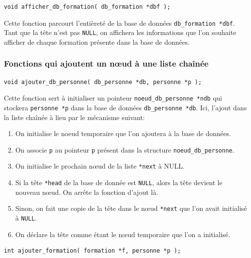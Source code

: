 \documentclass[11pt]{article}
\begin{document}
\begin{lstlisting}[firstnumber=559]
  void afficher_db_formation( db_formation *dbf );
\end{lstlisting}

Cette fonction parcourt l'entièreté de la base de données \texttt{db\_formation *dbf}. Tant que la tête n'est pas \texttt{NULL}, on affichera les informations que l'on souhaite afficher de chaque formation présente dans la base de données.

\subsubsection{Fonctions qui ajoutent un n\oe{}ud à une liste chaînée}

\begin{lstlisting}[firstnumber=187]
  void ajouter_db_personne( db_personne *db, personne *p );
\end{lstlisting}

Cette fonction sert à initialiser un pointeur \texttt{noeud\_db\_personne *ndb} qui stockera \texttt{personne *p} dans la base de données \texttt{db\_personne *db}. Ici, l'ajout dans la liste chaînée à lieu par le mécanisme suivant:
\begin{enumerate}
\item On initialise le noeud temporaire que l'on ajoutera à la base de données.
\item On associe \texttt{p} au pointeur \texttt{p} présent dans la structure \texttt{noeud\_db\_personne}.
\item On initialise le prochain n\oe{}ud de la liste \texttt{*next} à NULL.
\item Si la tête \texttt{*head} de la base de donnée est \texttt{NULL}, alors la tête devient le nouveau n\oe{}ud. On arrête la fonction d'ajout là.
\item Sinon, on fait une copie de la tête dans le n\oe{}ud \texttt{*next} que l'on avait initialisé à \texttt{NULL}.
\item On déclare la tête comme étant le n\oe{}ud temporaire que l'on a initialisé.
\end{enumerate}

\begin{lstlisting}[firstnumber=322]
  int ajouter_formation( formation *f, personne *p );
\end{lstlisting}
\end{document}
